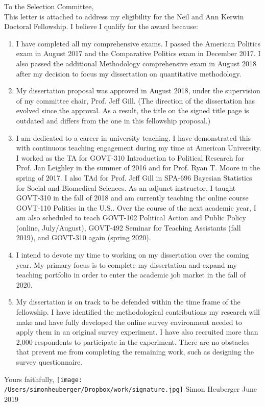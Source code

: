 



\noindent To the Selection Committee, \\

This letter is attached to address my eligibility for the Neil and Ann Kerwin Doctoral Fellowship. I believe I qualify for the award because:

\begin{enumerate}
	\item I have completed all my comprehensive exams. I passed the American Politics exam in August 2017 and the Comparative Politics exam in December 2017. I also passed the additional Methodology comprehensive exam in August 2018 after my decision to focus my dissertation on quantitative methodology.
	\item My dissertation proposal was approved in August 2018, under the supervision of my committee chair, Prof. Jeff Gill. (The direction of the dissertation has evolved since the approval. As a result, the title on the signed title page is outdated and differs from the one in this fellowship proposal.)
	\item I am dedicated to a career in university teaching. I have demonstrated this with continuous teaching engagement during my time at American University. I worked as the TA for GOVT-310 Introduction to Political Research for Prof. Jan Leighley in the summer of 2016 and for Prof. Ryan T. Moore in the spring of 2017. I also TAd for Prof. Jeff Gill in SPA-696 Bayesian Statistics for Social and Biomedical Sciences. As an adjunct instructor, I taught GOVT-310 in the fall of 2018 and am currently teaching the online course GOVT-110 Politics in the U.S.. Over the course of the next academic year, I am also scheduled to teach GOVT-102 Political Action and Public Policy (online, July/August), GOVT-492 Seminar for Teaching Assistants (fall 2019), and GOVT-310 again (spring 2020).
	\item I intend to devote my time to working on my dissertation over the coming year. My primary focus is to complete my dissertation and expand my teaching portfolio in order to enter the academic job market in the fall of 2020.
	\item My dissertation is on track to be defended within the time frame of the fellowship. I have identified the methodological contributions my research will make and have fully developed the online survey environment needed to apply them in an original survey experiment. I have also recruited more than 2,000 respondents to participate in the experiment. There are no obstacles that prevent me from completing the remaining work, such as designing the survey questionnaire.
\end{enumerate}

\noindent Yours faithfully, 
\newline \newline \texttt{[image: /Users/simonheuberger/Dropbox/work/signature.jpg]}
\newline Simon Heuberger
\newline June 2019












